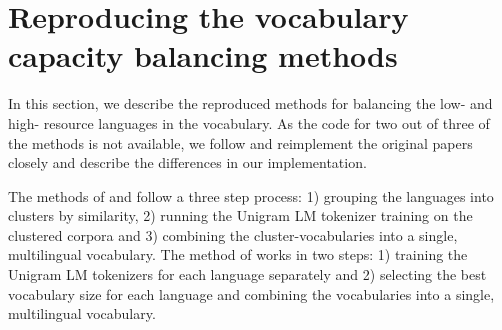 

\section{Reproducing the vocabulary capacity balancing methods}



In this section, we describe the reproduced methods for balancing the low- and high- resource languages in the vocabulary. As the code for two out of three of the methods is not available, we follow and reimplement the original papers closely and describe the differences in our implementation.

The methods of \citet{chung_improving_2020} and \citet{liang_xlm-v_2023} follow a three step process: 1) grouping the languages into clusters by similarity, 2) running the Unigram LM tokenizer training on the clustered corpora and 3) combining the cluster-vocabularies into a single, multilingual vocabulary. The method of \citet{zheng_allocating_2021} works in two steps: 1) training the Unigram LM tokenizers for each language separately and 2) selecting the best vocabulary size for each language and combining the vocabularies into a single, multilingual vocabulary.

